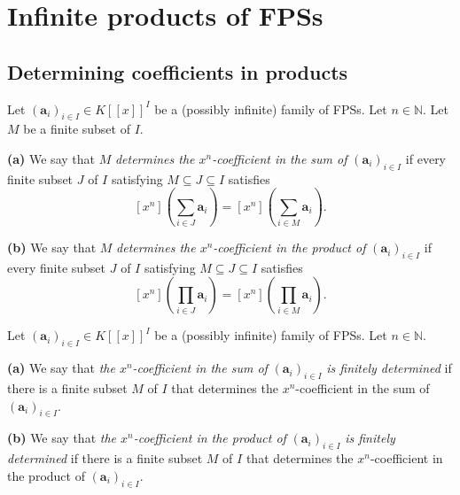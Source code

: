 \section{Infinite products of FPSs}

\subsection{Determining coefficients in products}

\begin{definition}
\label{def.fps.determines-xn-coeff}
\leantarget
\leanok
Let $\left(\mathbf{a}_{i}\right)_{i\in I}\in K\left[\left[x\right]\right]^{I}$
be a (possibly infinite) family of FPSs. Let $n\in\mathbb{N}$. Let $M$ be a
finite subset of $I$.

\textbf{(a)} We say that $M$ \emph{determines the $x^{n}$-coefficient in the
sum of} $\left(\mathbf{a}_{i}\right)_{i\in I}$ if every finite subset $J$ of
$I$ satisfying $M\subseteq J\subseteq I$ satisfies
\[
\left[x^{n}\right]\left(\sum_{i\in J}\mathbf{a}_{i}\right)
=\left[x^{n}\right]\left(\sum_{i\in M}\mathbf{a}_{i}\right).
\]

\textbf{(b)} We say that $M$ \emph{determines the $x^{n}$-coefficient in the
product of} $\left(\mathbf{a}_{i}\right)_{i\in I}$ if every finite subset $J$
of $I$ satisfying $M\subseteq J\subseteq I$ satisfies
\[
\left[x^{n}\right]\left(\prod_{i\in J}\mathbf{a}_{i}\right)
=\left[x^{n}\right]\left(\prod_{i\in M}\mathbf{a}_{i}\right).
\]
\end{definition}

\begin{definition}
\label{def.fps.xn-coeff-fin-determined}
\leantarget
\leanok
Let $\left(\mathbf{a}_{i}\right)_{i\in I}\in K\left[\left[x\right]\right]^{I}$
be a (possibly infinite) family of FPSs. Let $n\in\mathbb{N}$.

\textbf{(a)} We say that \emph{the $x^{n}$-coefficient in the sum of}
$\left(\mathbf{a}_{i}\right)_{i\in I}$ \emph{is finitely determined} if there
is a finite subset $M$ of $I$ that determines the $x^{n}$-coefficient in
the sum of $\left(\mathbf{a}_{i}\right)_{i\in I}$.

\textbf{(b)} We say that \emph{the $x^{n}$-coefficient in the product of}
$\left(\mathbf{a}_{i}\right)_{i\in I}$ \emph{is finitely determined} if there
is a finite subset $M$ of $I$ that determines the $x^{n}$-coefficient in
the product of $\left(\mathbf{a}_{i}\right)_{i\in I}$.
\end{definition}

